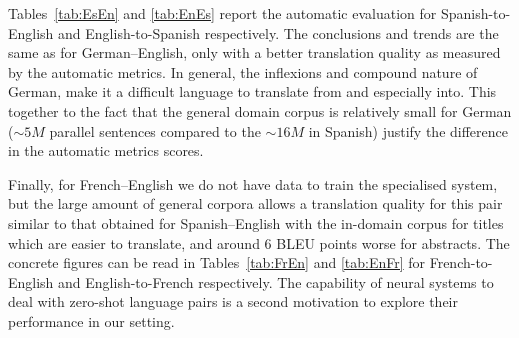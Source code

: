\documentclass[a4paper,11pt]{article}
\begin{document}
Tables~\ref{tab:EsEn} and \ref{tab:EnEs} report the automatic evaluation for Spanish-to-English and English-to-Spanish respectively. The conclusions and trends are the same as for German--English, only with a better translation quality as measured by the automatic metrics. In general, the inflexions and compound nature of German, make it a difficult language to translate from and especially into. This together to the fact that the general domain corpus is relatively small for German ($\sim5M$ parallel sentences compared to the $\sim16M$ in Spanish) justify the difference in the automatic metrics scores.

Finally, for French--English we do not have data to train the specialised system, but the large amount of general corpora allows a translation quality for this pair similar to that obtained for Spanish--English with the in-domain corpus for titles which are easier to translate, and around 6 BLEU points worse for abstracts. The concrete figures can be read in Tables~\ref{tab:FrEn} and \ref{tab:EnFr} for French-to-English and English-to-French respectively. The capability of neural systems to deal with zero-shot language pairs is a second motivation to explore their performance in our setting.
\end{document}
